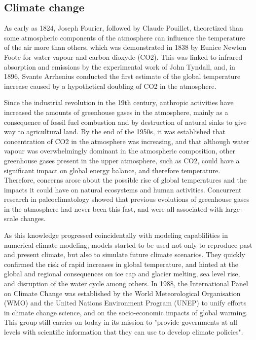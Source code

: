 

\subsection{Climate change}
As early as 1824, Joseph Fourier, followed by Claude Pouillet, theoretized than some atmospheric components of the atmosphere can influence the temperature of the air more than others, which was demonstrated in 1838 by Eunice Newton Foote for water vapour and carbon dioxyde (CO2). This was linked to infrared absorption and emissions by the experimental work of John Tyndall, and, in 1896, Svante Arrhenius conducted the first estimate of the global temperature increase caused by a hypothetical doubling of CO2 in the atmosphere.

Since the industrial revolution in the 19th century, anthropic activities have increased %
the amounts of greenhouse gases in the atmosphere, mainly as a consequence of fossil fuel combustion and by destruction of natural sinks to give way to agricultural land.
By the end of the 1950s, it was established that concentration of CO2 in the atmosphere was increasing, %
and that although water vapour was overwhelmingly dominant in the atmospheric composition, other greenhouse gases present in the upper atmosphere, such as CO2, could have a significant impact on global energy balance, and therefore temperature. Therefore, concerns arose about the possible rise of global temperatures and the impacts it could have on natural ecosystems and human activities.
Concurrent research in paleoclimatology showed that previous evolutions of greenhouse gases in the atmosphere had never been this fast, and were all associated with large-scale changes. 

As this knowledge progressed coincidentally with modeling capablilities in numerical climate modeling, models started to be used not only to reproduce past and present climate, but also to simulate future climate scenarios. They quickly confirmed the risk of rapid increases in global temperature, and hinted at the global and regional consequences on ice cap and glacier melting, sea level rise, and disruption of the water cycle among others. In 1988, the International Panel on Climate Change was established by the World Meteorological Organisation (WMO) and the United Nations Environment Program (UNEP) to unify efforts in climate change science, and on the socio-economic impacts of global warming. This group still carries on today in its mission to "provide governments at all levels with scientific information that they can use to develop climate policies".

